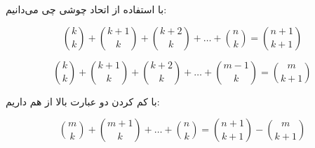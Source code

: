 \p		
با استفاده از اتحاد چوشی چی می‌دانیم:

\[
\binom{k}{k} + \binom{k + 1}{k} + \binom{k + 2}{k} +\ldots +
\binom{n}{k} = \binom{n + 1}{k + 1}
\]

\[
\binom{k}{k} + \binom{k + 1}{k} + \binom{k + 2}{k} +\ldots +
\binom{m - 1}{k} = \binom{m}{k + 1}
\]

با کم کردن دو عبارت بالا از هم داریم:

\[
\binom{m}{k} + \binom{m + 1}{k} +\ldots +
\binom{n}{k} = \binom{n + 1}{k + 1} - \binom{m}{k + 1}
\]